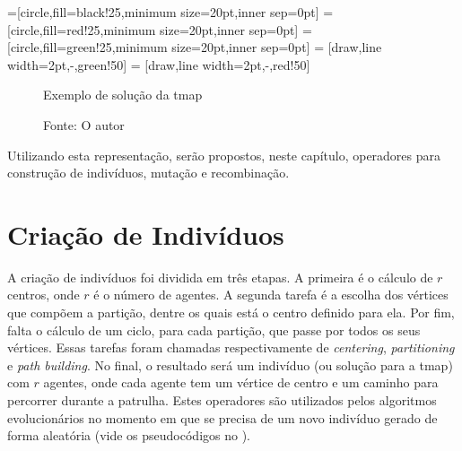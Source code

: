 =[circle,fill=black!25,minimum size=20pt,inner sep=0pt]
=[circle,fill=red!25,minimum size=20pt,inner sep=0pt]
=[circle,fill=green!25,minimum size=20pt,inner sep=0pt]
 = [draw,line width=2pt,-,green!50]
 = [draw,line width=2pt,-,red!50]

\begin{figure}
	\caption{Exemplo de solução da \ac{tmap}}
	\centering
	\caption*{Fonte: O autor}
	\label{fig:tmap_example}
\end{figure}

Utilizando esta representação, serão propostos, neste capítulo, operadores 
para construção de indivíduos, mutação e recombinação.

\section{Criação de Indivíduos}

A criação de 
indivíduos foi dividida em três etapas. A primeira é o cálculo de $r$ centros, 
onde $r$ é o número de agentes. 
A segunda tarefa é a escolha dos vértices que compõem a partição, dentre os 
quais está o centro definido para ela. Por fim, falta o cálculo de um ciclo, 
para cada partição, que passe por todos os seus vértices. Essas tarefas foram 
chamadas respectivamente de \textit{centering}, \textit{partitioning} e 
\textit{path building}. No final, o resultado será um indivíduo (ou solução 
para a \ac{tmap}) com $r$ agentes, onde cada agente tem um vértice de centro e 
um caminho para percorrer durante a patrulha. Estes operadores são utilizados 
pelos algoritmos evolucionários no momento em que se precisa de um novo 
indivíduo gerado de forma aleatória (vide os pseudocódigos no 
).

